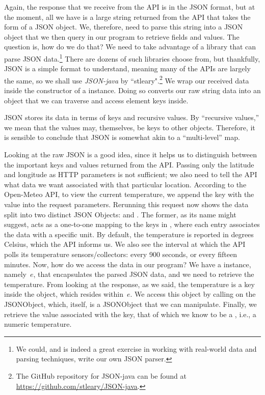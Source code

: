 Again, the response that we receive from the API is in the JSON format, but at the moment, all we have is a large string returned from the API that takes the form of a JSON object. 
We, therefore, need to parse this string into a JSON object that we then query in our program to retrieve fields and values. 
The question is, how do we do that? 
We need to take advantage of a library that can parse JSON data.\footnote{We could, and is indeed a great exercise in working with real-world data and parsing techniques, write our own JSON parser.} 
There are dozens of such libraries choose from, but thankfully, JSON is a simple format to understand, meaning many of the APIs are largely the same, so we shall use \emph{JSON-java} by ``stleary".\footnote{The GitHub repository for JSON-java can be found at \url{https://github.com/stleary/JSON-java}.}
We wrap our received data inside the constructor of a  instance. 
Doing so converts our raw string data into an object that we can traverse and access element keys inside. 

JSON stores its data in terms of keys and recursive values. 
By ``recursive values,'' we mean that the values may, themselves, be keys to other objects. 
Therefore, it is sensible to conclude that JSON is somewhat akin to a ``multi-level'' map. 

Looking at the raw JSON is a good idea, since it helps us to distinguish between the important keys and values returned from the API. 
Passing only the latitude and longitude as HTTP parameters is not sufficient; we also need to tell the API what data we want associated with that particular location. 
According to the Open-Meteo API, to view the current temperature, we append the  key with the  value into the request parameters. 
Rerunning this request now shows the data split into two distinct JSON Objects:  and . 
The former, as its name might suggest, acts as a one-to-one mapping to the keys in , where each entry associates the data with a specific unit. 
By default, the temperature is reported in degrees Celsius, which the API informs us. 
We also see the interval at which the API polls its temperature sensors/collectors: every 900 seconds, or every fifteen minutes.
Now, how do we access the data in our program? 
We have a  instance, namely~$e$, that encapsulates the parsed JSON data, and we need to retrieve the temperature. 
From looking at the response, as we said, the temperature is a key inside the  object, which resides within~$e$. 
We access this object by calling  on the JSONObject, which, itself, is a JSONObject that we can manipulate. 
Finally, we retrieve the value associated with the  key, that of which we know to be a , i.e., a numeric temperature.

